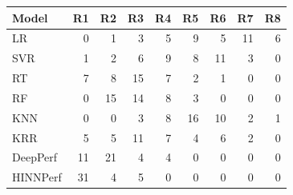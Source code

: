 \begin{tabular}{lrrrrrrrr}
\toprule
Model & R1 & R2 & R3 & R4 & R5 & R6 & R7 & R8 \\
\midrule
LR & 0 & 1 & 3 & 5 & 9 & 5 & 11 & 6 \\
SVR & 1 & 2 & 6 & 9 & 8 & 11 & 3 & 0 \\
RT & 7 & 8 & 15 & 7 & 2 & 1 & 0 & 0 \\
RF & 0 & 15 & 14 & 8 & 3 & 0 & 0 & 0 \\
KNN & 0 & 0 & 3 & 8 & 16 & 10 & 2 & 1 \\
KRR & 5 & 5 & 11 & 7 & 4 & 6 & 2 & 0 \\
DeepPerf & 11 & 21 & 4 & 4 & 0 & 0 & 0 & 0 \\
HINNPerf & 31 & 4 & 5 & 0 & 0 & 0 & 0 & 0 \\
\bottomrule
\end{tabular}
